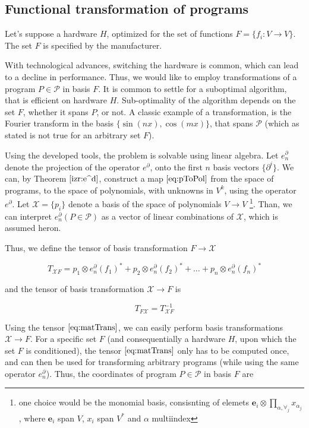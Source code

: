 \documentclass{article}
\newcommand{\e}{\mathbf{e}}
\newcommand{\X}{\mathcal{X}}
\newcommand{\dP}{\mathcal{P}}
\newcommand{\D}{\partial}
\begin{document}
   \subsection{Functional transformation of programs}\label{sec:FTP}
   
   Let's suppose a hardware $H$, optimized for the set of functions
   $F=\{f_i:V\to V\}$. The set $F$ is specified by the manufacturer.  
   
   With technological advances, switching the hardware is common, which can lead
   to a decline in performance.  Thus, we would like to employ transformations
   of a program $P\in\dP$ in basis $F$. It is common to settle for a suboptimal
   algorithm, that is efficient on hardware $H$. Sub-optimality of the algorithm
   depends on the set $F$, whether it spans $P$, or not. A classic example of a
   transformation, is the Fourier transform in the basis $\{\sin(nx),
   \cos(mx)\}$, that spans $\dP$ (which as stated is not true for an arbitrary
   set $F$).
   
   Using the developed tools, the problem is solvable using linear algebra. Let
   $e^\D_n$ denote the projection of the operator $e^\D$, onto the first $n$
   basis vectors $\{\D^i\}$. We can, by Theorem $\ref{izr:e^d}$, construct a map
   $\eqref{eq:pToPol}$ from the space of programs, to the space of polynomials,
   with unknowns in $V^k$, using the operator $e^\D$. Let $\X=\{p_i\}$ denote a basis of
   the space of polynomials $V\to V$ \footnote{one choice would be the monomial basis,
   consisnting of elemets $\e_i\otimes\prod\limits_{\alpha,\forall_j}
   x_{\alpha_j}$, where $\e_i$ span $V$, $x_i$ span $V^*$ and $\alpha$
   multiindex}. Than, we can interpret $e^\D_n(P\in\dP)$ as a vector of linear combinations of $\X$, which is assumed heron.
  
  Thus, we define the tensor of basis transformation $F\to\X$
  
  \begin{equation}\label{eq:matTransF}
  T_{\X F}=
  p_1\otimes e_n^\D(f_1)^* + p_2\otimes e_n^\D(f_2)^* + \ldots + p_n\otimes e_n^\D(f_n)^*
  \end{equation}
  
  and the tensor of basis transformation $\X\to F$ is
  
  \begin{equation}\label{eq:matTrans}
  T_{F\X}=T_{\X F}^{-1}
  \end{equation}
  
  Using the tensor $\eqref{eq:matTrans}$, we can easily perform basis transformations $\X\to F$. For a specific set $F$ (and consequentially a hardware $H$, upon which the set $F$ is conditioned), the tensor $\eqref{eq:matTrans}$ only has to be computed once, and can then be used for transforming arbitrary programs (while using the same operator $e^\D_n$).
  Thus, the coordinates of program $P\in\dP$ in basis $F$ are
  
\end{document}
